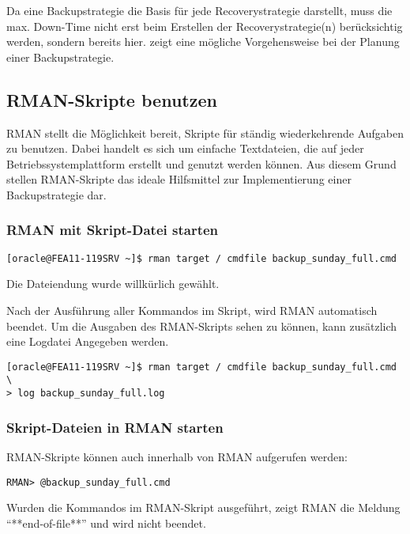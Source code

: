           Da eine Backupstrategie die Basis für jede Recoverystrategie darstellt, muss die max. Down-Time nicht erst beim Erstellen der Recoverystrategie(n) berücksichtig werden, sondern bereits hier.
           zeigt eine mögliche Vorgehensweise bei der Planung einer Backupstrategie.
\clearpage
      \subsection{RMAN-Skripte benutzen}
        RMAN stellt die Möglichkeit bereit, Skripte für ständig wiederkehrende Aufgaben zu benutzen. Dabei handelt es sich um einfache Textdateien, die auf jeder Betriebssystemplattform erstellt und genutzt werden können. Aus diesem Grund stellen RMAN-Skripte das ideale Hilfsmittel zur Implementierung einer Backupstrategie dar.
        \subsubsection{RMAN mit Skript-Datei starten}
          \begin{lstlisting}[caption={Aufrund eines RMAN-Skripts},label=admin1359,language=rman]
[oracle@FEA11-119SRV ~]$ rman target / cmdfile backup_sunday_full.cmd
          \end{lstlisting}
          \begin{merke}
            Die Dateiendung  wurde willkürlich gewählt.
          \end{merke}
          Nach der Ausführung aller Kommandos im Skript, wird RMAN automatisch beendet. Um die Ausgaben des RMAN-Skripts sehen zu können, kann zusätzlich eine Logdatei Angegeben werden.
          \begin{lstlisting}[caption={RMAN-Skript mit Log-Datei benutzen},label=admin1360,language=terminal]
[oracle@FEA11-119SRV ~]$ rman target / cmdfile backup_sunday_full.cmd \
> log backup_sunday_full.log
          \end{lstlisting}
        \subsubsection{Skript-Dateien in RMAN starten}
          RMAN-Skripte können auch innerhalb von RMAN aufgerufen werden:
          \begin{lstlisting}[caption={Ein Skript-Datei in RMAN aufrufen},label=admin1361,language=rman]
RMAN> @backup_sunday_full.cmd
        \end{lstlisting}
          Wurden die Kommandos im RMAN-Skript ausgeführt, zeigt RMAN die Meldung \enquote{**end-of-file**} und wird nicht beendet.
